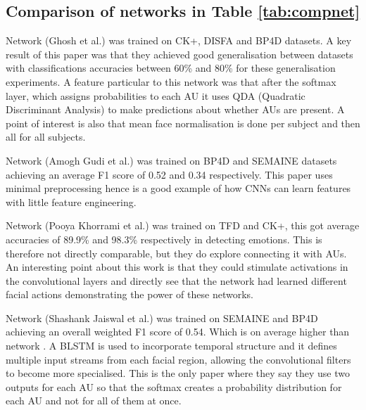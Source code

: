     \subsection*{Comparison of networks in Table \ref{tab:compnet}}
    Network \cite{Ghosh2015} (Ghosh et al.) was trained on CK+, DISFA and BP4D datasets.
    A key result of this paper was that they achieved good generalisation between datasets
    with classifications accuracies between 60\% and 80\% for these generalisation experiments.
    A feature particular to this network was that after the softmax layer, which assigns probabilities
    to each AU it uses QDA (Quadratic Discriminant Analysis\cite{precogbook})  to
    make predictions about whether AUs are present. A point of interest is also that
    mean face normalisation is done per subject and then all for all subjects.

    Network \cite{Gudi2015} (Amogh Gudi et al.) was trained on BP4D and SEMAINE
    datasets achieving an average F1 score of 0.52 and 0.34 respectively. This paper
    uses minimal preprocessing hence is a good example of how CNNs can learn features
    with little feature engineering.

    Network \cite{Khorrami2015} (Pooya Khorrami et al.) was trained on TFD and CK+,
    this got average accuracies of 89.9\% and 98.3\% respectively in detecting emotions. This
    is therefore not directly comparable, but they do explore connecting it with AUs.
    An interesting point about this work is that they could stimulate activations in the convolutional
    layers and directly see that the network had learned different facial actions demonstrating the
    power of these networks.

    Network \cite{Jaiswal2016} (Shashank Jaiswal et al.) was trained on SEMAINE and
    BP4D achieving an overall weighted F1 score of 0.54. Which is on average higher
    than network \cite{Gudi2015}. A BLSTM is used to incorporate temporal structure
    and it defines multiple input streams from each facial region, allowing the convolutional
    filters to become more specialised. This is the only paper where they say they use
    two outputs for each AU so that the softmax creates a probability distribution for
    each AU and not for all of them at once.

